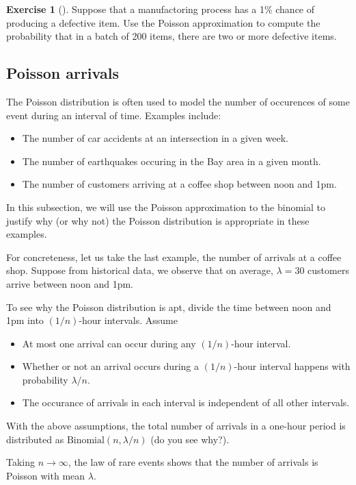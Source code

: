 \documentclass[11pt]{article}
\theoremstyle{definition}
\newtheorem{exercise}[]{Exercise}
\begin{document}
\begin{exercise}[]
Suppose that a manufactoring process has a
1\% chance of producing a defective item.
Use the Poisson approximation to compute the probability
that in a batch of 200 items, there are two or more
defective items.
\end{exercise}

\subsection{Poisson arrivals}

The Poisson distribution is often used to model the number
of occurences of some event during an interval of time.
Examples include:
\begin{itemize}
  \item The number of car accidents at an
   intersection in a given week.
  \item The number of earthquakes occuring in the Bay area in a given month.
  \item The number of customers arriving at a coffee shop between noon and 1pm.
\end{itemize}

In this subsection, we will use the Poisson approximation
to the binomial to justify why (or why not) the
Poisson distribution is appropriate in these examples.

For concreteness, let us take the last example, the number
of arrivals at a coffee shop.
Suppose from historical data, we observe that on average,
$\lambda = 30$ customers arrive between noon and 1pm.

To see why the Poisson distribution is apt,
divide the time between noon and 1pm into $(1/n)$-hour
intervals. Assume
\begin{itemize}
  \item At most one arrival can occur during any
  $(1/n)$-hour interval.
  \item Whether or not an arrival occurs during a
  $(1/n)$-hour interval happens with probability $\lambda / n$.
  \item The occurance of arrivals in each interval is independent of all other intervals.
\end{itemize}

With the above assumptions, the total number of arrivals
in a one-hour period is distributed as
$\text{Binomial}(n, \lambda / n)$ (do you see why?).

Taking $n\rightarrow\infty$, the law of rare events
shows that the number
of arrivals is Poisson with mean $\lambda$.
\end{document}

